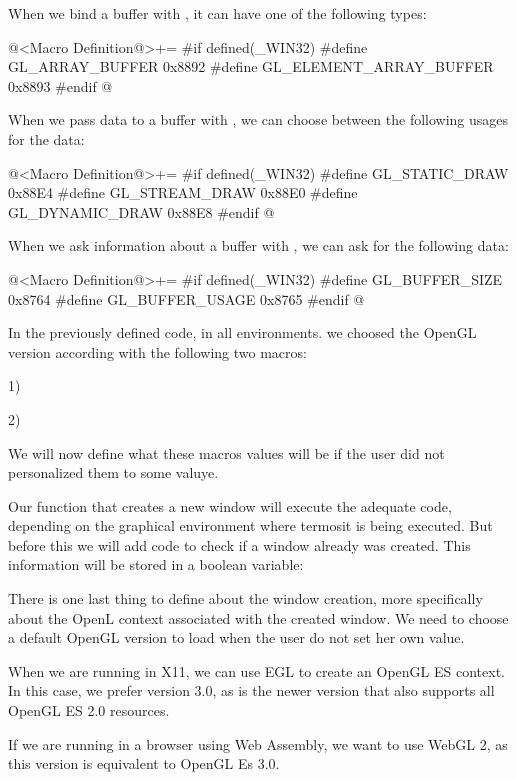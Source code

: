 When we bind a buffer with , it can have one
of the following types:

\iniciocodigo
@<Macro Definition@>+=
#if defined(_WIN32)
#define GL_ARRAY_BUFFER         0x8892
#define GL_ELEMENT_ARRAY_BUFFER 0x8893
#endif
@
\fimcodigo

When we pass data to a buffer with , we can
choose between the following usages for the data:

\iniciocodigo
@<Macro Definition@>+=
#if defined(_WIN32)
#define GL_STATIC_DRAW  0x88E4
#define GL_STREAM_DRAW  0x88E0
#define GL_DYNAMIC_DRAW 0x88E8
#endif
@
\fimcodigo

When we ask information about a buffer
with , we can ask for the following
data:

\iniciocodigo
@<Macro Definition@>+=
#if defined(_WIN32)
#define GL_BUFFER_SIZE  0x8764
#define GL_BUFFER_USAGE 0x8765
#endif
@
\fimcodigo


In the previously defined code, in all environments. we choosed the
OpenGL version according with the following two macros:

1) 

2) 

We will now define what these macros values will be if the user did
not personalized them to some valuye.






Our function that creates a new window will execute the adequate code,
depending on the graphical environment where termosit is being
executed. But before this we will add code to check if a window
already was created. This information will be stored in a boolean
variable:

There is one last thing to define about the window creation, more
specifically about the OpenL context associated with the created
window. We need to choose a default OpenGL version to load when the
user do not set her own value.

When we are running in X11, we can use EGL to create an OpenGL ES
context. In this case, we prefer version 3.0, as is the newer version
that also supports all OpenGL ES 2.0 resources.

If we are running in a browser using Web Assembly, we want to use
WebGL 2, as this version is equivalent to OpenGL Es 3.0.

